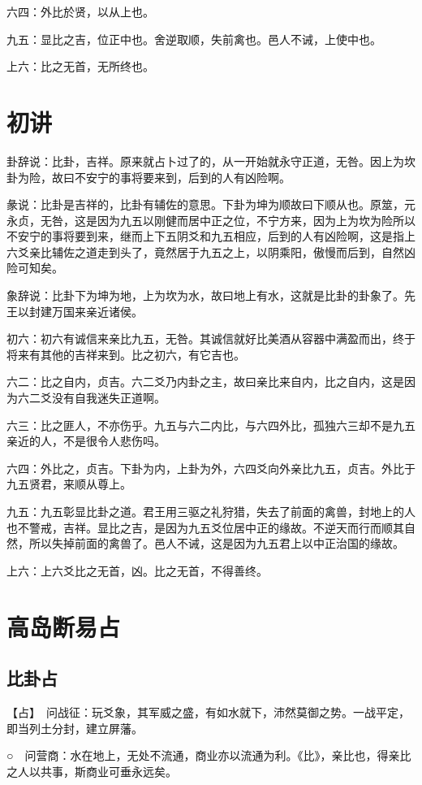 \documentclass[12pt,oneside]{book}
\begin{document}
六四：外比於贤，以从上也。

九五：显比之吉，位正中也。舍逆取顺，失前禽也。邑人不诫，上使中也。

上六：比之无首，无所终也。

\section{初讲}
卦辞说：比卦，吉祥。原来就占卜过了的，从一开始就永守正道，无咎。因上为坎卦为险，故曰不安宁的事将要来到，后到的人有凶险啊。

彖说：比卦是吉祥的，比卦有辅佐的意思。下卦为坤为顺故曰下顺从也。原筮，元永贞，无咎，这是因为九五以刚健而居中正之位，不宁方来，因为上为坎为险所以不安宁的事将要到来，继而上下五阴爻和九五相应，后到的人有凶险啊，这是指上六爻亲比辅佐之道走到头了，竟然居于九五之上，以阴乘阳，傲慢而后到，自然凶险可知矣。

象辞说：比卦下为坤为地，上为坎为水，故曰地上有水，这就是比卦的卦象了。先王以封建万国来亲近诸侯。

初六：初六有诚信来亲比九五，无咎。其诚信就好比美酒从容器中满盈而出，终于将来有其他的吉祥来到。比之初六，有它吉也。

六二：比之自内，贞吉。六二爻乃内卦之主，故曰亲比来自内，比之自内，这是因为六二爻没有自我迷失正道啊。

六三：比之匪人，不亦伤乎。九五与六二内比，与六四外比，孤独六三却不是九五亲近的人，不是很令人悲伤吗。

六四：外比之，贞吉。下卦为内，上卦为外，六四爻向外亲比九五，贞吉。外比于九五贤君，来顺从尊上。

九五：九五彰显比卦之道。君王用三驱之礼狩猎，失去了前面的禽兽，封地上的人也不警戒，吉祥。显比之吉，是因为九五爻位居中正的缘故。不逆天而行而顺其自然，所以失掉前面的禽兽了。邑人不诫，这是因为九五君上以中正治国的缘故。

上六：上六爻比之无首，凶。比之无首，不得善终。


\section{高岛断易占}
\subsection{比卦占}
【占】　问战征：玩爻象，其军威之盛，有如水就下，沛然莫御之势。一战平定，即当列土分封，建立屏藩。

○　问营商：水在地上，无处不流通，商业亦以流通为利。《比》，亲比也，得亲比之人以共事，斯商业可垂永远矣。
\end{document}
